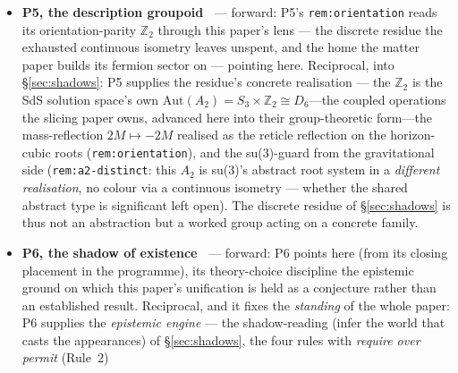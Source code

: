 \documentclass[11pt,a4paper]{article}
\theoremstyle{definition}
\begin{document}
\begin{itemize}
scatter $\sim10^{-2}$, some two hundred times the entire measured anisotropy
of the microwave background) forces the cosmic foliation as a \emph{measured}
feature, and \texttt{thm:augmentation} establishes CR as the \emph{necessary
and sufficient} augmentation of general relativity for a description of an
existing, evolving world (the lapse the objective rate of advance, the shift
the relativity of synchrony). So the necessity of the first rung is not
posited but \emph{measured} --- the empirical counterpart of P1's structural
forcing, which stands on causal structure alone and needs none of this
evidence. Under the Copernican principle the same datum reaches the maximal
symmetry of the slices (the seventh rung, universality as the invariance of the
measure), which P4 marks as an \emph{extrapolation} beyond the directly
constrained region --- a scope \S\ref{sec:unification} inherits, not softens.
\item \textbf{P5, the description groupoid~\cite{JanzenGroupoid}} --- forward: P5's \texttt{rem:orientation} reads its orientation-parity $\mathbb{Z}_2$ through this paper's lens ---
the discrete residue the exhausted continuous isometry leaves unspent, and
the home the matter paper builds its fermion sector on --- pointing here.
Reciprocal, into \S\ref{sec:shadows}: P5 supplies the residue's concrete
realisation --- the $\mathbb{Z}_2$ is the SdS solution space's own
$\mathrm{Aut}(A_2)=S_3\times\mathbb{Z}_2\cong D_6$---the coupled operations the slicing paper owns, advanced here into their group-theoretic form---the mass-reflection
$2M\mapsto-2M$ realised as the reticle reflection on the horizon-cubic roots
(\texttt{rem:orientation}), and the su(3)-guard from the gravitational side
(\texttt{rem:a2-distinct}: this $A_2$ is su(3)'s abstract root system in a
\emph{different realisation}, no colour via a continuous isometry --- whether
the shared abstract type is significant left open). The discrete residue of
\S\ref{sec:shadows} is thus not an abstraction but a worked group acting on
a concrete family.
\item \textbf{P6, the shadow of existence~\cite{JanzenShadowExistence}} --- forward: P6 points here (from its
closing placement in the programme), its theory-choice discipline the
epistemic ground on which this paper's
unification is held as a conjecture rather than an established result. Reciprocal, and it fixes the \emph{standing} of
the whole paper: P6 supplies the \emph{epistemic engine} --- the
shadow-reading (infer the world that casts the appearances) of
\S\ref{sec:shadows}, the four rules with \emph{require over permit} (Rule~2)

\end{itemize}
\end{document}
